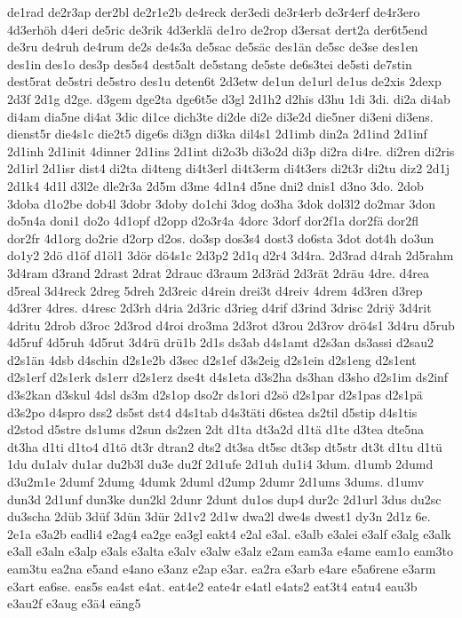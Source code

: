 {de1rad
de2r3ap
der2bl
de2r1e2b
de4reck
der3edi
de3r4erb
de3r4erf
de4r3ero
4d3erhöh
d4eri
de5ric
de3rik
4d3erklä
de1ro
de2rop
d3ersat
dert2a
der6t5end
de3ru
de4ruh
de4rum
de2s
de4s3a
de5sac
de5säc
des1än
de5sc
de3se
des1en
des1in
des1o
des3p
des5s4
dest5alt
de5stang
de5ste
de6s3tei
de5sti
de7stin
dest5rat
de5stri
de5stro
des1u
deten6t
2d3etw
de1un
de1url
de1us
de2xis
2dexp
2d3f
2d1g
d2ge.
d3gem
dge2ta
dge6t5e
d3gl
2d1h2
d2his
d3hu
1di
3di.
di2a
di4ab
di4am
dia5ne
di4at
3dic
di1ce
dich3te
di2de
di2e
di3e2d
die5ner
di3eni
di3ens.
dienst5r
die4s1c
die2t5
dige6s
di3gn
di3ka
dil4s1
2d1imb
din2a
2d1ind
2d1inf
2d1inh
2d1init
4dinner
2d1ins
2d1int
di2o3b
di3o2d
di3p
di2ra
di4re.
di2ren
di2ris
2d1irl
2d1isr
dist4
di2ta
di4teng
di4t3erl
di4t3erm
di4t3ers
di2t3r
di2tu
diz2
2d1j
2d1k4
4d1l
d3l2e
dle2r3a
2d5m
d3me
4d1n4
d5ne
dni2
dnis1
d3no
3do.
2dob
3doba
d1o2be
dob4l
3dobr
3doby
do1chi
3dog
do3ha
3dok
dol3l2
do2mar
3don
do5n4a
doni1
do2o
4d1opf
d2opp
d2o3r4a
4dorc
3dorf
dor2f1a
dor2fä
dor2fl
dor2fr
4d1org
do2rie
d2orp
d2os.
do3sp
dos3s4
dost3
do6sta
3dot
dot4h
do3un
do1y2
2dö
d1öf
d1öl1
3dör
dö4s1c
2d3p2
2d1q
d2r4
3d4ra.
2d3rad
d4rah
2d5rahm
3d4ram
d3rand
2drast
2drat
2drauc
d3raum
2d3räd
2d3rät
2dräu
4dre.
d4rea
d5real
3d4reck
2dreg
5dreh
2d3reic
d4rein
drei3t
d4reiv
4drem
4d3ren
d3rep
4d3rer
4dres.
d4resc
2d3rh
d4ria
2d3ric
d3rieg
d4rif
d3rind
3drisc
2dri^^ff
3d4rit
4dritu
2drob
d3roc
2d3rod
d4roi
dro3ma
2d3rot
d3rou
2d3rov
drö4s1
3d4ru
d5rub
4d5ruf
4d5ruh
4d5rut
3d4rü
drü1b
2d1s
ds3ab
d4s1amt
d2s3an
ds3assi
d2sau2
d2s1än
4dsb
d4schin
d2s1e2b
d3sec
d2s1ef
d3s2eig
d2s1ein
d2s1eng
d2s1ent
d2s1erf
d2s1erk
ds1err
d2s1erz
dse4t
d4s1eta
d3s2ha
ds3han
d3sho
d2s1im
ds2inf
d3s2kan
d3skul
4dsl
ds3m
d2s1op
dso2r
ds1ori
d2sö
d2s1par
d2s1pas
d2s1pä
d3s2po
d4spro
dss2
ds5st
dst4
d4s1tab
d4s3täti
d6stea
ds2til
d5stip
d4s1tis
d2stod
d5stre
ds1ums
d2sun
ds2zen
2dt
d1ta
dt3a2d
d1tä
d1te
d3tea
dte5na
dt3ha
d1ti
d1to4
d1tö
dt3r
dtran2
dts2
dt3sa
dt5sc
dt3sp
dt5str
dt3t
d1tu
d1tü
1du
du1alv
du1ar
du2b3l
du3e
du2f
2d1ufe
2d1uh
du1i4
3dum.
d1umb
2dumd
d3u2m1e
2dumf
2dumg
4dumk
2duml
d2ump
2dumr
2d1ums
3dums.
d1umv
dun3d
2d1unf
dun3ke
dun2kl
2dunr
2dunt
du1os
dup4
dur2c
2d1url
3dus
du2sc
du3scha
2düb
3düf
3dün
3dür
2d1v2
2d1w
dwa2l
dwe4s
dwest1
dy3n
2d1z
6e.
2e1a
e3a2b
eadli4
e2ag4
ea2ge
ea3gl
eakt4
e2al
e3al.
e3alb
e3alei
e3alf
e3alg
e3alk
e3all
e3aln
e3alp
e3als
e3alta
e3alv
e3alw
e3alz
e2am
eam3a
e4ame
eam1o
eam3to
eam3tu
ea2na
e5and
e4ano
e3anz
e2ap
e3ar.
ea2ra
e3arb
e4are
e5a6rene
e3arm
e3art
ea6se.
eas5s
ea4st
e4at.
eat4e2
eate4r
e4atl
e4ats2
eat3t4
eatu4
eau3b
e3au2f
e3aug
e3ä4
eäng5
}
